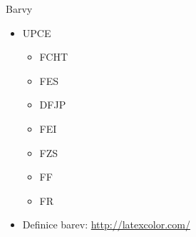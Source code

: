 \documentclass{beamer}							%
\begin{document}
\begin{frame}[fragile, shrink=0]{Barvy}
	\begin{itemize}
		\item \textcolor{upce}{UPCE}
		\begin{itemize}
			\item \textcolor{fcht}{FCHT}
			\item \textcolor{fes}{FES}
			\item \textcolor{dfjp}{DFJP}
			\item \textcolor{fei}{FEI}
			\item \textcolor{fzs}{FZS}
			\item \textcolor{ff}{FF} 
			\item \textcolor{fr}{FR} 
		\end{itemize}

		\item Definice barev: \url{http://latexcolor.com/} 
	\end{itemize}
\end{frame}
\end{document}
